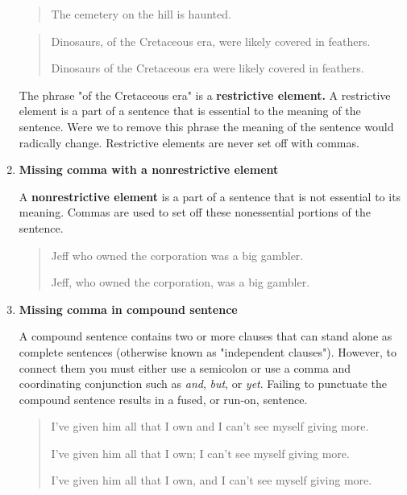 \begin{enumerate}
\begin{quote}
The cemetery on the hill is haunted. 

\end{quote}


\begin{quote}
Dinosaurs, of the Cretaceous era, were likely covered in feathers.  

Dinosaurs of the Cretaceous era were likely covered in feathers.  

\end{quote}

 The phrase "of the Cretaceous era" is a \textbf{restrictive element.} 
A restrictive element is a part of a sentence that is essential to the meaning 
of the sentence. Were we to remove this phrase the meaning of the sentence would 
radically change. Restrictive elements are never set off with commas.

\item \textbf{Missing comma with a nonrestrictive element}

A \textbf{nonrestrictive element} is a part of a sentence that is not essential to its
meaning. Commas are used to set off these nonessential portions of the
sentence.

\begin{quote}
Jeff who owned the corporation was a big gambler. 

Jeff, who owned the corporation, was a big gambler. 
\end{quote}

\item \textbf{Missing comma in compound sentence}

A compound sentence contains two or more clauses that can stand alone as
complete sentences (otherwise known as "independent clauses"). However,
to connect them you must either use a semicolon or use a comma and
coordinating conjunction such as \emph{and}, \emph{but}, or \emph{yet}. Failing
to punctuate the compound sentence results in a fused, or run-on, sentence.

\begin{quote}
I've given him all that I own and I can't see myself giving more. 

I've given him all that I own; I can't see myself giving more.  

I've given him all that I own, and I can't see myself giving more. 

\end{quote}


\end{enumerate}
